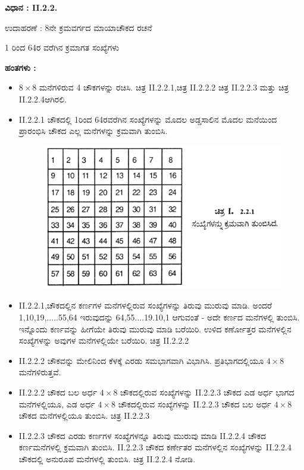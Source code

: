 \noindent \textbf{ವಿಧಾನ : II.2.2.}

ಉದಾಹರಣೆ : 8ನೇ ಕ್ರಮವರ್ಗದ ಮಾಯಾಚೌಕದ ರಚನೆ

1 ರಿಂದ 64ರ ವರೆಗಿನ ಕ್ರಮಾಗತ ಸಂಖ್ಯೆಗಳು

\textbf{ಹಂತಗಳು :}
\begin{itemize}
	\item $8 \times 8$ ಮನೆಗಳಿರುವ 4 ಚೌಕಗಳನ್ನು ರಚಿಸಿ. ಚಿತ್ರ II.2.2.1,ಚಿತ್ರ II.2.2.2 ಚಿತ್ರ II.2.2.3 ಮತ್ತು ಚಿತ್ರ II.2.2.4ಆಗಿರಲಿ.
	\item II.2.2.1 ಚೌಕದಲ್ಲಿ 1ರಿಂದ 64ರವರೆಗಿನ ಸಂಖ್ಯೆಗಳನ್ನು ಮೊದಲ ಅಡ್ಡಸಾಲಿನ ಮೊದಲ ಮನೆಯಿಂದ ಪ್ರಾರಂಭಿಸಿ ಚೌಕದ ಎಲ್ಲ ಮನೆಗಳನ್ನು ಕ್ರಮವಾಗಿ ತುಂಬಿಸಿ.
	\begin{figure}[H]
	\includegraphics{src/figures/chap3/fig3-20.jpg}
	\end{figure}
	\item II.2.2.1,ಚೌಕದಲ್ಲಿನ ಕರ್ಣಗಳ ಮನೆಗಳಲ್ಲಿರುವ ಸಂಖ್ಯೆಗಳನ್ನು ತಿರುವು ಮುರುವು ಮಾಡಿ. ಅಂದರೆ 1,10,19,.....55,64 ಇರುವುದನ್ನು 64,55....19.10,1 ಆಗುವಂತೆ - ಅದೇ ಕರ್ಣದ ಮನೆಗಳಲ್ಲಿ ತುಂಬಿಸಿ. ಇನ್ನೊಂದು ಕರ್ಣವನ್ನು ಹೀಗೆಯೇ ತಿರುವು ಮುರುವು ಮಾಡಿ ಬರೆಯಿರಿ. ಉಳಿದ ಕರ್ಣೋತ್ತರ ಮನೆಗಳಲ್ಲಿನ ಸಂಖ್ಯೆಗಳನ್ನು ಅವುಗಳ ಮನೆಗಳಲ್ಲಿಯೇ ಬರೆಯಿರಿ. ಚಿತ್ರ II.2.2.2
	\item II.2.2.2 ಚೌಕವನ್ನು ಮೇಲಿನಿಂದ ಕೆಳಕ್ಕೆ ಎರಡು ಸಮಭಾಗವಾಗಿ ವಿಭಾಗಿಸಿ. ಪ್ರತಿಭಾಗದಲ್ಲಿಯೂ $4 \times 8$ ಮನೆಗಳಿರುತ್ತವೆ.
	\item II.2.2.2 ಚೌಕದ ಬಲ ಅರ್ಧ $4 \times 8$ ಚೌಕದಲ್ಲಿರುವ ಸಂಖ್ಯೆಗಳನ್ನು II.2.2.3 ಚೌಕದ ಎಡ ಅರ್ಧ ಭಾಗದ ಮನೆಗಳಲ್ಲಿಯೂ, ಎಡ ಅರ್ಧ $4 \times 8$ ಚೌಕದಲ್ಲಿರುವ ಸಂಖ್ಯೆಗಳನ್ನು II.2.2.3 ಚೌಕದ ಬಲ ಅರ್ಧ $4 \times 8$ ಚೌಕದ ಮನೆಗಳಲ್ಲಿಯೂ ತುಂಬಿಸಿ. ಚಿತ್ರ II.2.2.3
	\item II.2.2.3 ಚೌಕದ ಎರಡು ಕರ್ಣಗಳ ಸಂಖ್ಯೆಗಳನ್ನೂ ತಿರುವು ಮುರುವು ಮಾಡಿ II.2.2.4 ಚೌಕದ ಕರ್ಣಮನೆಗಳಲ್ಲಿ ಕ್ರಮವಾಗಿ ತುಂಬಿಸಿ. II.2.2.3 ಚೌಕದ ಕರ್ಣೇತರ ಮನೆಗಳಲ್ಲಿನ ಸಂಖ್ಯೆಗಳನ್ನು II.2.2.4 ಚೌಕದಲ್ಲಿ ಅನುರೂಪ ಮನೆಗಳಲ್ಲಿ ತುಂಬಿಸಿ. ಚಿತ್ರ II.2.2.4 ನೋಡಿ.


\end{itemize}
